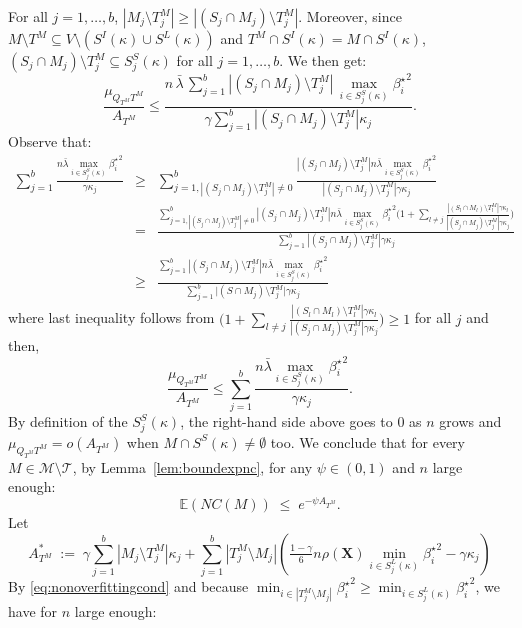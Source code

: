 \documentclass[aos]{imsart}
\theoremstyle{plain}
\newcommand{\E}{\mathbb{E}}
\newcommand{\T}{\mathcal{T}}
\newcommand{\bs}{\boldsymbol}
\begin{document}
For all $j=1,\ldots,b$, $|M_j \setminus T^M_j| \geq |(S_j\cap M_j )\setminus T^M_j|$. Moreover, since  $M\setminus T^M\subseteq V\setminus (S^{I}(\kappa) \cup S^L(\kappa))$ and $T^M\cap S^{I}(\kappa)=M\cap S^{I}(\kappa)$, $(S_j\cap M_j )\setminus T^M_j \subseteq S^{S}_j(\kappa)$ for all $j=1,\ldots,b$. We then get:
$$\frac{\mu_{Q_{T^M} T^M}}{ A_{T^M}} \leq \frac{n\,\bar{\lambda}\,\sum_{j=1}^b|(S_j\cap M_j )\setminus T^M_j|\,\max_{i\in S^{S}_j(\kappa)}{\beta_{i}^{\star}}^2}{ \gamma\sum_{j=1}^b|(S_j\cap M_j ) \setminus T^M_j|\kappa_j}.$$
Observe that:
\begin{eqnarray*}
    \sum_{j=1}^b\frac{n\bar{\lambda}\max_{i\in S^{S}_j(\kappa)}{\beta_i^{\star}}^2}{\gamma\kappa_j}
    &\geq &\sum_{j=1,|(S_j\cap M_j )\setminus T^M_j|\neq 0}^b\frac{|(S_j\cap M_j )\setminus T^M_j|n\bar{\lambda}\max_{i\in S^{S}_j(\kappa)}{\beta_i^{\star}}^2}{|(S_j\cap M_j )\setminus T^M_j|\gamma\kappa_j} \\
    &=& \frac{\sum_{j=1,|(S_j\cap M_j )\setminus T^M_j|\neq 0 }^b|(S_j\cap M_j )\setminus T^M_j|n\bar{\lambda}\max_{i\in S^{S}_j(\kappa)}{\beta_i^{\star}}^2\Big(1+\sum_{l\neq j}\frac{|(S_l\cap M_l)\setminus T^M_l|\gamma\kappa_l}{|(S_j\cap M_j )\setminus T^M_j|\gamma\kappa_j}\Big)}{\sum_{j=1}^b|(S_j\cap M_j )\setminus T^M_j|\gamma\kappa_j} \\
    &\geq & \frac{\sum_{j=1}^b|(S_j\cap M_j )\setminus T^M_j|n\bar{\lambda}\max_{i\in S^{S}_j(\kappa)}{\beta_i^{\star}}^2}{\sum_{j=1}^b \big|(S\cap M_j)\setminus T^M_j\big|\gamma\kappa_j} 
\end{eqnarray*}
where last inequality follows from $\Big(1+\sum_{l\neq j}\frac{|(S_l\cap M_l)\setminus T^M_l|\gamma\kappa_l}{|(S_j\cap M_j )\setminus T^M_j|\gamma\kappa_j}\Big)\geq 1$ for all $j$ and then,
$$\frac{\mu_{Q_{T^M} T^M}}{ A_{T^M}} \leq \sum_{j=1}^b\frac{n\bar{\lambda}\max_{i\in S^{S}_j(\kappa)}{\beta_i^{\star}}^2}{\gamma\kappa_j}.$$
By definition of the $S_j^{S}(\kappa)$, the right-hand side above goes to 0 as $n$ grows and $\mu_{Q_{T^M} T^M}=o(A_{T^M})$ when $M\cap S^{S}(\kappa)\neq\emptyset$ too. 
We conclude that for every $M\in \mathcal M\setminus \T$, by Lemma~\ref{lem:boundexpnc}, for any $\psi\in(0,1)$ and $n$ large enough:
$$
\E(NC(M))\;\leq\;e^{-\psi A_{T^M}}.
$$
Let 
$$A_{T^M}^*\;:=\;\gamma\sum_{j=1}^b|M_j \setminus T^M_j|\kappa_j + \sum_{j=1}^b |T^M_j\setminus M_j |\left(\tfrac{1-\gamma}{6} n \rho(\bs X) \min_{i\in S^{L}_j(\kappa)}{\beta^{\star}_i}^{2} - \gamma\kappa_j\right) $$
By \eqref{eq:nonoverfittingcond} and because $\min_{i\in |T^M_j\setminus M_j|}{\beta^{\star}_i}^{2}\geq \min_{i\in S^{L}_j(\kappa)}{\beta^{\star}_i}^{2}$, we have for $n$ large enough:
\end{document}

